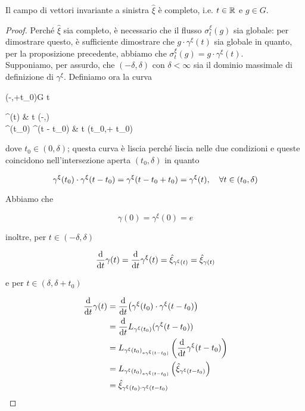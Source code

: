 \begin{definition}
	Il campo di vettori invariante a sinistra $ \hat{\xi} $ è completo, i.e. $ t \in \mathbb{R} $ e $ g \in G $.
\end{definition}

\begin{proof}
	Perché $ \hat{\xi} $ sia completo, è necessario che il flusso $ \sigma_{t}^{\xi}(g) $ sia globale: per dimostrare questo, è sufficiente dimostrare che $ g \cdot \gamma^{\xi}(t) $ sia globale in quanto, per la proposizione precedente, abbiamo che $ \sigma_{t}^{\xi}(g) = g \cdot \gamma^{\xi}(t) $.\\
	Supponiamo, per assurdo, che $ (-\delta,\delta) $ con $ \delta < \infty $ sia il dominio massimale di definizione di $ \gamma^{\xi} $. Definiamo ora la curva
	
	\map{\gamma}%
		{(-\delta,\delta +t_{0})}{G}%
		{t}{%
			\begin{cases}
				\gamma^{\xi}(t) & t \in (-\delta,\delta)\\
				\gamma^{\xi}(t_{0}) \cdot \gamma^{\xi}(t - t_{0}) & t \in (t_{0},\delta + t_{0})
			\end{cases}%
			}
		
	dove $ t_{0} \in (0,\delta) $; questa curva è liscia perché liscia nelle due condizioni e queste coincidono nell'intersezione aperta $ (t_{0},\delta) $ in quanto
	
	\begin{equation}
		\gamma^{\xi}(t_{0}) \cdot \gamma^{\xi}(t - t_{0}) = \gamma^{\xi}(t - t_{0} + t_{0}) = \gamma^{\xi}(t) \qcomma \forall t \in (t_{0},\delta)
	\end{equation}

	Abbiamo che
	
	\begin{equation}
		\gamma(0) = \gamma^{\xi}(0) = e
	\end{equation}
	
	inoltre, per $ t \in (-\delta,\delta) $
	
	\begin{equation}
		\dv{t} \gamma(t) = \dv{t} \gamma^{\xi}(t) = \hat{\xi}_{\gamma^{\xi}(t)} = \hat{\xi}_{\gamma(t)}
	\end{equation}

	e per $ t \in (\delta,\delta + t_{0}) $
	
	\begin{align}
		\begin{split}
			\dv{t} \gamma(t) &= \dv{t} ( \gamma^{\xi}(t_{0}) \cdot \gamma^{\xi}(t - t_{0}) )\\
			&= \dv{t} L_{\gamma^{\xi}(t_{0})} ( \gamma^{\xi}(t - t_{0}) )\\
			&= L_{\gamma^{\xi}(t_{0})_{*\gamma^{\xi}(t - t_{0})}} \left( \dv{t} \gamma^{\xi}(t - t_{0}) \right)\\
			&= L_{\gamma^{\xi}(t_{0})_{*\gamma^{\xi}(t - t_{0})}} \left( \hat{\xi}_{\gamma^{\xi}(t - t_{0})} \right)\\
			&= \hat{\xi}_{\gamma^{\xi}(t_{0}) \cdot \gamma^{\xi}(t - t_{0})}
		\end{split}
	\end{align}
	

\end{proof}
